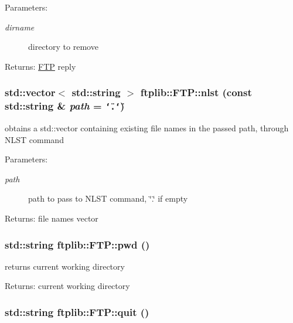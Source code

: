 \begin{Desc}
\item[Parameters:]
\begin{description}
\item[{\em dirname}]directory to remove \end{description}
\end{Desc}
\begin{Desc}
\item[Returns:]\hyperlink{classftplib_1_1FTP}{FTP} reply \end{Desc}
\hypertarget{classftplib_1_1FTP_a793fa113ee6fc82e3db3b7ed769ff3f}{
\subsubsection[{nlst}]{\setlength{\rightskip}{0pt plus 5cm}std::vector$<$ std::string $>$ ftplib::FTP::nlst (const std::string \& {\em path} = {\tt \char`\"{}.\char`\"{}})}}
\label{classftplib_1_1FTP_a793fa113ee6fc82e3db3b7ed769ff3f}


obtains a std::vector containing existing file names in the passed path, through NLST command 

\begin{Desc}
\item[Parameters:]
\begin{description}
\item[{\em path}]path to pass to NLST command, \char`\"{}.\char`\"{} if empty \end{description}
\end{Desc}
\begin{Desc}
\item[Returns:]file names vector \end{Desc}
\hypertarget{classftplib_1_1FTP_7c01c7b062848c7fc1d3caf95758b109}{
\subsubsection[{pwd}]{\setlength{\rightskip}{0pt plus 5cm}std::string ftplib::FTP::pwd ()}}
\label{classftplib_1_1FTP_7c01c7b062848c7fc1d3caf95758b109}


returns current working directory 

\begin{Desc}
\item[Returns:]current working directory \end{Desc}
\hypertarget{classftplib_1_1FTP_bd6e018a5cc17b1c8007064830823c71}{
\subsubsection[{quit}]{\setlength{\rightskip}{0pt plus 5cm}std::string ftplib::FTP::quit ()}}
\label{classftplib_1_1FTP_bd6e018a5cc17b1c8007064830823c71}


